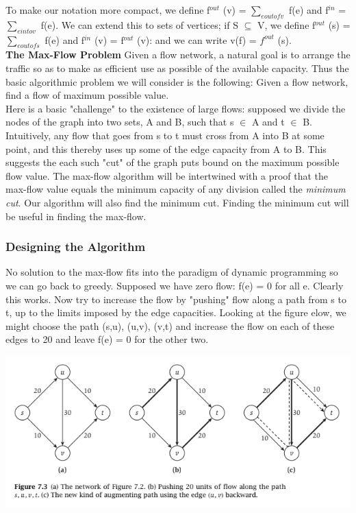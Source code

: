 \documentclass{article}
\begin{document}
 To make our notation more compact, we define f$^{out}$ (v) = $\sum_{e out of v}^{}$ f(e) and f$^{in}$ = $\sum_{e into v}^{}$ f(e). We can extend this to sets of vertices; if S $\subseteq$ V, we define f$^{out}$ (s) = $\sum_{e out of s}^{}$ f(e) and f$^{in}$ (v) = f$^{out}$ (v): and we can write v(f) = $f^{out}$ (s).\\

 \textbf{The Max-Flow Problem} Given a flow network, a natural goal is to arrange the traffic so as to make as efficient use as possible of the available capacity. Thus the basic algorithmic problem we will consider is the following: Given a flow network, find a flow of maximum possible value.\\

 Here is a basic "challenge" to the existence of large flows: supposed we divide the nodes of the graph into two sets, A and B, such that s $\in$ A and t $\in$ B. Intuitively, any flow that goes from s to t must cross from A into B at some point, and this thereby uses up some of the edge capacity from A to B. This suggests the each such "cut" of the graph puts bound on the maximum possible flow value. The max-flow algorithm will be intertwined with a proof that the max-flow value equals the minimum capacity of any division called the \emph{minimum cut}. Our algorithm will also find the minimum cut. Finding the minimum cut will be useful in finding the max-flow.\\

\subsubsection{Designing the Algorithm}
No solution to the max-flow fits into the paradigm of dynamic programming so we can go back to greedy. Supposed we have zero flow: f(e) = 0 for all e. Clearly this works. Now try to increase the flow by "pushing" flow along a path from s to t, up to the limits imposed by the edge capacities. Looking at the figure elow, we might choose the path {(s,u), (u,v), (v,t)} and increase the flow on each of these edges to 20 and leave f(e) = 0 for the other two.\\

\begin{center}
    \includegraphics[]{figures/fig21.png}
\end{center}
\end{document}

